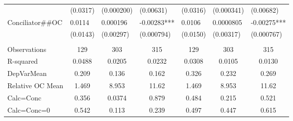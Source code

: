 \begin{tabular}{lrrrrrr}
      & \multicolumn{1}{l}{(0.0317)} & \multicolumn{1}{l}{(0.000200)} & \multicolumn{1}{l}{(0.00631)} & \multicolumn{1}{l}{(0.0316)} & \multicolumn{1}{l}{(0.000341)} & \multicolumn{1}{l}{(0.00682)} \\
Conciliator\#\#OC & \multicolumn{1}{l}{0.0114} & \multicolumn{1}{l}{0.000196} & \multicolumn{1}{l}{-0.00283***} & \multicolumn{1}{l}{0.0106} & \multicolumn{1}{l}{0.0000805} & \multicolumn{1}{l}{-0.00275***} \\
      & \multicolumn{1}{l}{(0.0143)} & \multicolumn{1}{l}{(0.00297)} & \multicolumn{1}{l}{(0.000794)} & \multicolumn{1}{l}{(0.0150)} & \multicolumn{1}{l}{(0.00317)} & \multicolumn{1}{l}{(0.000767)} \\
      & \multicolumn{1}{l}{} & \multicolumn{1}{l}{} & \multicolumn{1}{l}{} & \multicolumn{1}{l}{} & \multicolumn{1}{l}{} & \multicolumn{1}{l}{} \\
      \midrule
Observations & \multicolumn{1}{c}{129} & \multicolumn{1}{c}{303} & \multicolumn{1}{c}{315} & \multicolumn{1}{c}{129} & \multicolumn{1}{c}{303} & \multicolumn{1}{c}{315} \\
R-squared & \multicolumn{1}{c}{0.0488} & \multicolumn{1}{c}{0.0205} & \multicolumn{1}{c}{0.0232} & \multicolumn{1}{c}{0.0308} & \multicolumn{1}{c}{0.0105} & \multicolumn{1}{c}{0.0130} \\
DepVarMean & \multicolumn{1}{c}{0.209} & \multicolumn{1}{c}{0.136} & \multicolumn{1}{c}{0.162} & \multicolumn{1}{c}{0.326} & \multicolumn{1}{c}{0.232} & \multicolumn{1}{c}{0.269} \\
Relative OC Mean & \multicolumn{1}{c}{1.469} & \multicolumn{1}{c}{8.953} & \multicolumn{1}{c}{11.62} & \multicolumn{1}{c}{1.469} & \multicolumn{1}{c}{8.953} & \multicolumn{1}{c}{11.62} \\
Calc=Conc & \multicolumn{1}{c}{0.356} & \multicolumn{1}{c}{0.0374} & \multicolumn{1}{c}{0.879} & \multicolumn{1}{c}{0.484} & \multicolumn{1}{c}{0.215} & \multicolumn{1}{c}{0.521} \\
Calc=Conc=0 & \multicolumn{1}{c}{0.542} & \multicolumn{1}{c}{0.113} & \multicolumn{1}{c}{0.239} & \multicolumn{1}{c}{0.497} & \multicolumn{1}{c}{0.447} & \multicolumn{1}{c}{0.615} \\
\bottomrule
\bottomrule
\end{tabular}%
